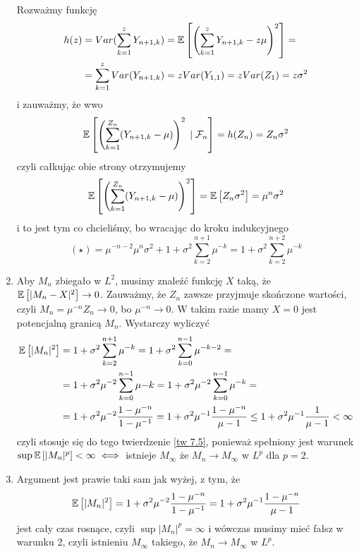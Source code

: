 \begin{solution}
\begin{enumerate}[label=(\alph*)]
      Rozważmy funkcję 
      \begin{align*}
        h(z)&=Var(\sum_{k=1}^zY_{n+1,k})=\expected{\left(\sum_{k=1}^zY_{n+1,k}-z\mu\right)^2}=\\ 
            &=\sum_{k=1}^zVar(Y_{n+1,k})=zVar(Y_{1,1})=zVar(Z_1)=z\sigma^2
      \end{align*}
      i zauważmy, że wwo
      $$\expected{\left(\sum_{k=1}^{Z_n}(Y_{n+1,k}-\mu)\right)^2}{\set{F}_n}=h(Z_n)=Z_n\sigma^2$$
      czyli całkując obie strony otrzymujemy
      $$\expected{\left(\sum_{k=1}^{Z_n}(Y_{n+1,k}-\mu)\right)^2}=\expected{Z_n\sigma^2}=\mu^n\sigma^2$$
      i to jest tym co chcieliśmy, bo wracając do kroku indukcyjnego
      $$(\star)=\mu^{-n-2}\mu^n \sigma^2+1+\sigma^2\sum_{k=2}^{n+1}\mu^{-k}=1+\sigma^2\sum_{k=2}^{n+2}\mu^{-k}$$
    \item Aby $M_n$ zbiegało w $L^2$, musimy znaleźć funkcję $X$ taką, że $\expected{|M_n-X|^2}\to 0$. Zauważmy, że $Z_n$ zawsze przyjmuje skończone wartości, czyli $M_n=\mu^{-n}Z_n\to 0$, bo $\mu^{-n}\to 0$. W takim razie mamy $X=0$ jest potencjalną granicą $M_n$. Wystarczy wyliczyć
      \begin{align*}
        \expected{|M_n|^2}&=1+\sigma^2\sum_{k=2}^{n+1}\mu^{-k}=1+\sigma^2\sum_{k=0}^{n-1}\mu^{-k-2}=\\ 
                          &=1+\sigma^2\mu^{-2}\sum_{k=0}^{n-1}\mu{-k}=1+\sigma^2\mu^{-2}\sum_{k=0}^{n-1}\mu^{-k}=\\ 
                          &=1+\sigma^2\mu^{-2}\frac{1-\mu^{-n}}{1-\mu^{-1}}=1+\sigma^2\mu^{-1}\frac{1-\mu^{-n}}{\mu-1}\leq 1+\sigma^2\mu^{-1}\frac{1}{\mu-1}<\infty
      \end{align*}
      czyli stosuje się do tego twierdzenie \ref{tw 7.5}, ponieważ spełniony jest warunek $\sup\expected{|M_n|^p}<\infty\iff$ istnieje $M_\infty$ że $M_n\to M_\infty$ w $L^p$ dla $p=2$.
    \item Argument jest prawie taki sam jak wyżej, z tym, że
      $$\expected{|M_n|^2}=1+\sigma^2\mu^{-2}\frac{1-\mu^{-n}}{1-\mu^{-1}}=1+\sigma^2\mu^{-1}\frac{1-\mu^{-n}}{\mu-1}$$
      jest cały czas rosnące, czyli $\sup{|M_n|^p}=\infty$ i wówczas musimy mieć fałsz w warunku 2, czyli istnieniu $M_\infty$ takiego, że $M_n\to M_\infty$ w $L^p$.
  \end{enumerate}
\end{solution}

